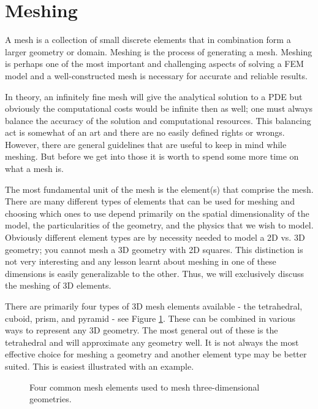 \section{Meshing}\label{sec:meshing}

A mesh is a collection of small discrete elements that in combination form a larger geometry or domain.
Meshing is the process of generating a mesh.
Meshing is perhaps one of the most important and challenging aspects of solving a FEM model and a well-constructed mesh is necessary for accurate and reliable results.\par

In theory, an infinitely fine mesh will give the analytical solution to a PDE but obviously the computational costs would be infinite then as well; one must always balance the accuracy of the solution and computational resources.
This balancing act is somewhat of an art and there are no easily defined rights or wrongs.
However, there are general guidelines that are useful to keep in mind while meshing.
But before we get into those it is worth to spend some more time on what a mesh is.\par

The most fundamental unit of the mesh is the element(s) that comprise the mesh.
There are many different types of elements that can be used for meshing and choosing which ones to use depend primarily on the spatial dimensionality of the model, the particularities of the geometry, and the physics that we wish to model.
Obviously different element types are by necessity needed to model a 2D vs. 3D geometry; you cannot mesh a 3D geometry with 2D squares.
This distinction is not very interesting and any lesson learnt about meshing in one of these dimensions is easily generalizable to the other.
Thus, we will exclusively discuss the meshing of 3D elements.\par

There are primarily four types of 3D mesh elements available - the tetrahedral, cuboid, prism, and pyramid - see Figure \ref{fig:3d_elements}.
These can be combined in various ways to represent any 3D geometry.
The most general out of these is the tetrahedral and will approximate any geometry well.
It is not always the most effective choice for meshing a geometry and another element type may be better suited.
This is easiest illustrated with an example.\par

\begin{figure}
  \caption{Four common mesh elements used to mesh three-dimensional geometries.}
  \label{fig:3d_elements}
\end{figure}

